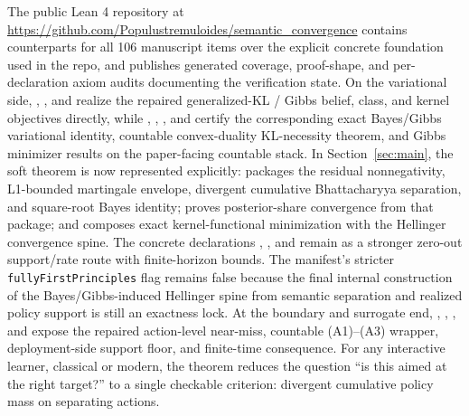 \documentclass[11pt]{article}
\theoremstyle{definition}
\theoremstyle{remark}
\begin{document}
The public Lean 4 repository at \url{https://github.com/Populustremuloides/semantic_convergence} contains counterparts for all 106 manuscript items over the explicit concrete foundation used in the repo, and publishes generated coverage, proof-shape, and per-declaration axiom audits documenting the verification state. On the variational side, , , and  realize the repaired generalized-KL / Gibbs belief, class, and kernel objectives directly, while , , , and  certify the corresponding exact Bayes/Gibbs variational identity, countable convex-duality KL-necessity theorem, and Gibbs minimizer results on the paper-facing countable stack. In Section~\ref{sec:main}, the soft theorem is now represented explicitly:  packages the residual nonnegativity, L1-bounded martingale envelope, divergent cumulative Bhattacharyya separation, and square-root Bayes identity;  proves posterior-share convergence from that package; and  composes exact kernel-functional minimization with the Hellinger convergence spine. The concrete declarations , , and  remain as a stronger zero-out support/rate route with finite-horizon bounds. The manifest's stricter \texttt{fullyFirstPrinciples} flag remains false because the final internal construction of the Bayes/Gibbs-induced Hellinger spine from semantic separation and realized policy support is still an exactness lock. At the boundary and surrogate end, , , , and  expose the repaired action-level near-miss, countable \textup{(A1)--(A3)} wrapper, deployment-side support floor, and finite-time consequence. For any interactive learner, classical or modern, the theorem reduces the question ``is this aimed at the right target?'' to a single checkable criterion: divergent cumulative policy mass on separating actions.



\end{document}
